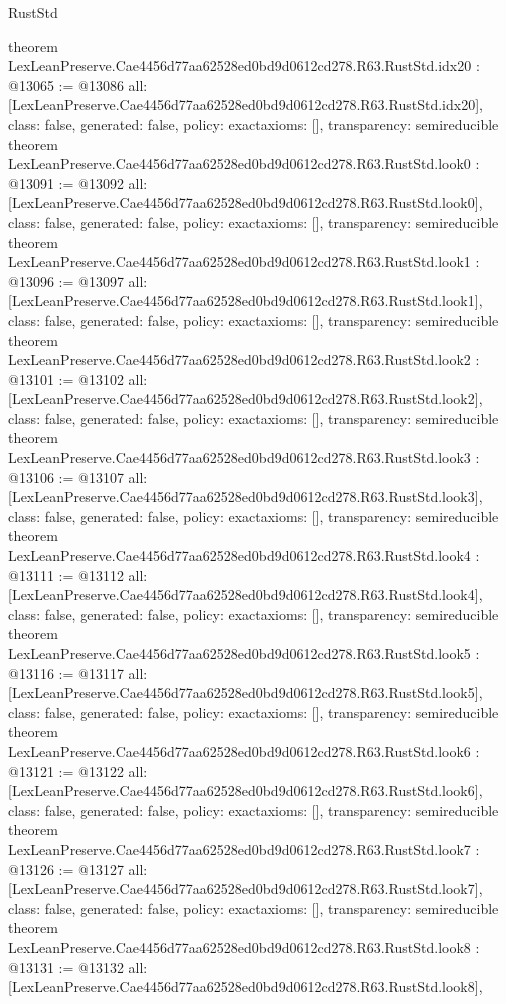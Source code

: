 \begin{lexlean}{RustStd}
\begin{coremodule}
{}
theorem LexLeanPreserve.Cae4456d77aa62528ed0bd9d0612cd278.R63.RustStd.idx20 : @13065 := @13086 {
  all: [LexLeanPreserve.Cae4456d77aa62528ed0bd9d0612cd278.R63.RustStd.idx20],
  class: false,
  generated: false,
  policy: exact{axioms: []},
  transparency: semireducible
}
theorem LexLeanPreserve.Cae4456d77aa62528ed0bd9d0612cd278.R63.RustStd.look0 : @13091 := @13092 {
  all: [LexLeanPreserve.Cae4456d77aa62528ed0bd9d0612cd278.R63.RustStd.look0],
  class: false,
  generated: false,
  policy: exact{axioms: []},
  transparency: semireducible
}
theorem LexLeanPreserve.Cae4456d77aa62528ed0bd9d0612cd278.R63.RustStd.look1 : @13096 := @13097 {
  all: [LexLeanPreserve.Cae4456d77aa62528ed0bd9d0612cd278.R63.RustStd.look1],
  class: false,
  generated: false,
  policy: exact{axioms: []},
  transparency: semireducible
}
theorem LexLeanPreserve.Cae4456d77aa62528ed0bd9d0612cd278.R63.RustStd.look2 : @13101 := @13102 {
  all: [LexLeanPreserve.Cae4456d77aa62528ed0bd9d0612cd278.R63.RustStd.look2],
  class: false,
  generated: false,
  policy: exact{axioms: []},
  transparency: semireducible
}
theorem LexLeanPreserve.Cae4456d77aa62528ed0bd9d0612cd278.R63.RustStd.look3 : @13106 := @13107 {
  all: [LexLeanPreserve.Cae4456d77aa62528ed0bd9d0612cd278.R63.RustStd.look3],
  class: false,
  generated: false,
  policy: exact{axioms: []},
  transparency: semireducible
}
theorem LexLeanPreserve.Cae4456d77aa62528ed0bd9d0612cd278.R63.RustStd.look4 : @13111 := @13112 {
  all: [LexLeanPreserve.Cae4456d77aa62528ed0bd9d0612cd278.R63.RustStd.look4],
  class: false,
  generated: false,
  policy: exact{axioms: []},
  transparency: semireducible
}
theorem LexLeanPreserve.Cae4456d77aa62528ed0bd9d0612cd278.R63.RustStd.look5 : @13116 := @13117 {
  all: [LexLeanPreserve.Cae4456d77aa62528ed0bd9d0612cd278.R63.RustStd.look5],
  class: false,
  generated: false,
  policy: exact{axioms: []},
  transparency: semireducible
}
theorem LexLeanPreserve.Cae4456d77aa62528ed0bd9d0612cd278.R63.RustStd.look6 : @13121 := @13122 {
  all: [LexLeanPreserve.Cae4456d77aa62528ed0bd9d0612cd278.R63.RustStd.look6],
  class: false,
  generated: false,
  policy: exact{axioms: []},
  transparency: semireducible
}
theorem LexLeanPreserve.Cae4456d77aa62528ed0bd9d0612cd278.R63.RustStd.look7 : @13126 := @13127 {
  all: [LexLeanPreserve.Cae4456d77aa62528ed0bd9d0612cd278.R63.RustStd.look7],
  class: false,
  generated: false,
  policy: exact{axioms: []},
  transparency: semireducible
}
theorem LexLeanPreserve.Cae4456d77aa62528ed0bd9d0612cd278.R63.RustStd.look8 : @13131 := @13132 {
  all: [LexLeanPreserve.Cae4456d77aa62528ed0bd9d0612cd278.R63.RustStd.look8],
}
\end{coremodule}
\end{lexlean}
